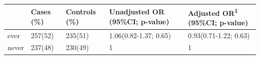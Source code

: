 \documentclass[
]{article}
\begin{document}
\begin{longtable}[]{@{}lllll@{}}
\toprule
\begin{minipage}[b]{0.06\columnwidth}\raggedright
\strut
\end{minipage} & \begin{minipage}[b]{0.10\columnwidth}\raggedright
Cases (\%)\strut
\end{minipage} & \begin{minipage}[b]{0.12\columnwidth}\raggedright
Controls (\%)\strut
\end{minipage} & \begin{minipage}[b]{0.29\columnwidth}\raggedright
Unadjusted OR (95\%CI; p-value)\strut
\end{minipage} & \begin{minipage}[b]{0.28\columnwidth}\raggedright
Adjusted OR\textsuperscript{1} (95\%CI; p-value)\strut
\end{minipage}\tabularnewline
\midrule
\endhead
\begin{minipage}[t]{0.06\columnwidth}\raggedright
ever\strut
\end{minipage} & \begin{minipage}[t]{0.10\columnwidth}\raggedright
257(52)\strut
\end{minipage} & \begin{minipage}[t]{0.12\columnwidth}\raggedright
235(51)\strut
\end{minipage} & \begin{minipage}[t]{0.29\columnwidth}\raggedright
1.06(0.82-1.37; 0.65)\strut
\end{minipage} & \begin{minipage}[t]{0.28\columnwidth}\raggedright
0.93(0.71-1.22; 0.63)\strut
\end{minipage}\tabularnewline
\begin{minipage}[t]{0.06\columnwidth}\raggedright
never\strut
\end{minipage} & \begin{minipage}[t]{0.10\columnwidth}\raggedright
237(48)\strut
\end{minipage} & \begin{minipage}[t]{0.12\columnwidth}\raggedright
230(49)\strut
\end{minipage} & \begin{minipage}[t]{0.29\columnwidth}\raggedright
1\strut
\end{minipage} & \begin{minipage}[t]{0.28\columnwidth}\raggedright
1\strut
\end{minipage}\tabularnewline
\bottomrule
\end{longtable}
\end{document}
